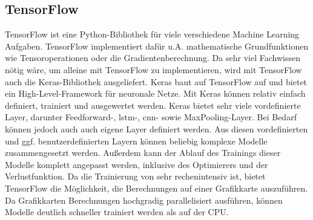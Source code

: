 \subsection{TensorFlow}
\label{sec:TensorFlow}

TensorFlow ist eine Python-Bibliothek für viele verschiedene Machine Learning Aufgaben.
TensorFlow implementiert dafür u.A. mathematische Grundfunktionen wie Tensoroperationen oder die Gradientenberechnung.
Da sehr viel Fachwissen nötig wäre, um alleine mit TensorFlow  zu implementieren, wird mit TensorFlow auch die Keras-Bibliothek ausgeliefert.
Keras baut auf TensorFlow auf und bietet ein High-Level-Framework für neuronale Netze.
Mit Keras können  relativ einfach definiert, trainiert und ausgewertet werden.
Keras bietet sehr viele vordefinierte Layer, darunter Feedforward-, \acrshort{lstm}-, \acrshort{cnn}- sowie MaxPooling-Layer.
Bei Bedarf können jedoch auch auch eigene Layer definiert werden.
Aus diesen vordefinierten und ggf. benutzerdefinierten Layern können beliebig komplexe Modelle zusammengesetzt werden.
Außerdem kann der Ablauf des Trainings dieser Modelle komplett angepasst werden, inklusive des Optimierers und der Verlustfunktion.
Da die Trainierung von  sehr rechenintensiv ist, bietet TensorFlow die Möglichkeit, die Berechnungen auf einer Grafikkarte auszuführen.
Da Grafikkarten Berechnungen hochgradig parallelisiert ausführen, können Modelle deutlich schneller trainiert werden als auf der CPU.

